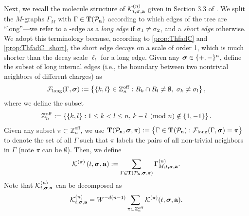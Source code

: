 Next, we recall the molecule structure of $\mathcal{K}^{(n)}_{t,{\boldsymbol{\sigma}}, \mathbf{a}}$ given in Section 3.3 of \cite{YY_25}. We split the $M$-graphs $\Gamma_M$ with $\Gamma\in \operatorname{{\mathbf T}}(\mathcal{P}_{\mathbf{a}})$ according to which edges of the tree are ``long''---we refer to a -edge as a \emph{long edge} if $\sigma_1\ne \sigma_2$, and a \emph{short edge} otherwise. We adopt this terminology because, according to \eqref{prop:ThfadC} and \eqref{prop:ThfadC_short}, the short edge decays on a scale of order 1, which is much shorter than the decay scale $\ell_t$ for a long edge. Given any ${\boldsymbol{\sigma}} \in \{+, -\}^{n}$, define the subset of long internal edges (i.e., the boundary between two nontrivial neighbors of different charges) as 
\[
{\cal F}_{\mathrm{long}}(\Gamma, \bsig) := \left\{\{k,l\} \in \Z^{\mathrm{off}}_n: R_k\cap R_l\neq \emptyset ,\ \sigma_k\ne \sigma_l \right\},
\]
where we define the subset 
\[
\mathbb{Z}^{\mathrm{off}}_n :=\left\{\{k, l\} : 1 \leq k < l \leq n,\, k - l \pmod n \notin \{1,-1\}\right\}.
\]
Given any subset \(\pi \subset \mathbb{Z}_n^{\mathrm{off}}\), we use \(\operatorname{{\mathbf T}}(\mathcal{P}_{{\mathbf{a}}}, {\boldsymbol{\sigma}}, \pi) := \big\{\Gamma \in \operatorname{{\mathbf T}}(\mathcal{P}_{{\mathbf{a}}}) : {\mathcal F}_{\text{long}}(\Gamma, {\boldsymbol{\sigma}}) = \pi\big\}\) to denote the set of all $\Gamma$ such that \(\pi\) labels the pairs of all non-trivial neighbors in $\Gamma$ (note $\pi$ can be $\emptyset$). Then, we define 
  \begin{align}\label{eq:defKpi}
    \mathcal K^{\left({\pi}\right)}\left({t,{\boldsymbol{\sigma}},{\mathbf{a}}}\right)
      :=\sum_{\Gamma \in \operatorname{{\mathbf T}}\left({\mathcal{P}_{{\mathbf{a}}}, {\boldsymbol{\sigma}}, \pi}\right)} \Gamma^{\left({n}\right)}_{M;t,{\boldsymbol{\sigma}},{\mathbf{a}}}  .
  \end{align}
Note that $\mathcal{K}^{(n)}_{t,{\boldsymbol{\sigma}}, \mathbf{a}}$ can be decomposed as 
\begin{equation}\label{eq_K-Kpi}
    \mathcal{K}^{(n)}_{t, {\boldsymbol{\sigma}}, \mathbf{a}} = W^{-d(n-1)}\sum_{\pi\subset \mathbb{Z}_n^{\rm{off}}} \mathcal{K}^{(\pi)}(t, {\boldsymbol{\sigma}}, \mathbf{a}).
\end{equation}
